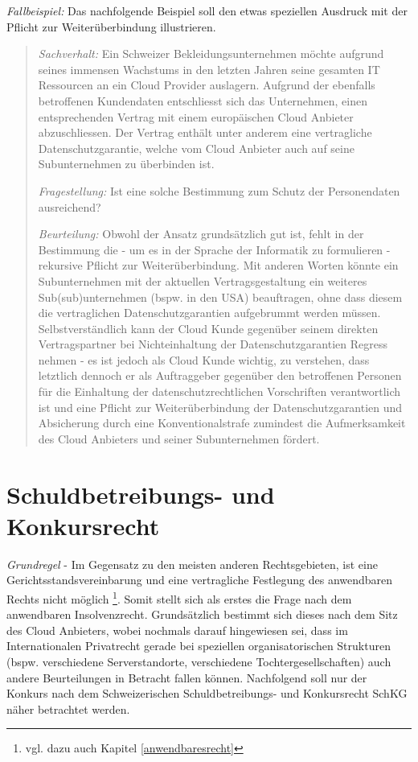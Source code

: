 \documentclass[a4paper,pointlessnumbers]{scrreprt}
\begin{document}
\textit{Fallbeispiel:} Das nachfolgende Beispiel soll den etwas speziellen Ausdruck \glqq mit der Pflicht zur Weiterüberbindung\grqq{} illustrieren.

\begin{quote}
\textit{Sachverhalt:} Ein Schweizer Bekleidungsunternehmen möchte aufgrund seines immensen Wachstums in den letzten Jahren seine gesamten IT Ressourcen an ein Cloud Provider auslagern. Aufgrund der ebenfalls betroffenen Kundendaten entschliesst sich das Unternehmen, einen entsprechenden Vertrag mit einem europäischen Cloud Anbieter abzuschliessen. Der Vertrag enthält unter anderem eine vertragliche Datenschutzgarantie, welche vom Cloud Anbieter auch auf seine Subunternehmen zu überbinden ist.

\textit{Fragestellung:} Ist eine solche Bestimmung zum Schutz der Personendaten ausreichend?

\textit{Beurteilung:} Obwohl der Ansatz grundsätzlich gut ist, fehlt in der Bestimmung die - um es in der Sprache der Informatik zu formulieren - rekursive Pflicht zur Weiterüberbindung. Mit anderen Worten könnte ein Subunternehmen mit der aktuellen Vertragsgestaltung ein weiteres Sub(sub)unternehmen (bspw. in den USA) beauftragen, ohne dass diesem die vertraglichen Datenschutzgarantien aufgebrummt werden müssen. Selbstverständlich kann der Cloud Kunde gegenüber seinem direkten Vertragspartner bei Nichteinhaltung der Datenschutzgarantien Regress nehmen -  es ist jedoch als Cloud Kunde wichtig, zu verstehen, dass letztlich dennoch er als Auftraggeber gegenüber den betroffenen Personen für die Einhaltung der datenschutzrechtlichen Vorschriften verantwortlich ist und eine Pflicht zur Weiterüberbindung der Datenschutzgarantien und Absicherung durch eine Konventionalstrafe zumindest die Aufmerksamkeit des Cloud Anbieters und seiner Subunternehmen fördert.
\end{quote}

\pagebreak

\section{Schuldbetreibungs- und Konkursrecht}\label{konkurs}
\textit{Grundregel} - Im Gegensatz zu den meisten anderen Rechtsgebieten, ist eine Gerichtsstandsvereinbarung und eine vertragliche Festlegung des anwendbaren Rechts nicht möglich \footnote{vgl. dazu auch Kapitel \ref{anwendbaresrecht}}. Somit stellt sich als erstes die Frage nach dem anwendbaren Insolvenzrecht. Grundsätzlich bestimmt sich dieses nach dem Sitz des Cloud Anbieters, wobei nochmals darauf hingewiesen sei, dass im Internationalen Privatrecht gerade bei speziellen organisatorischen Strukturen (bspw. verschiedene Serverstandorte, verschiedene Tochtergesellschaften) auch andere Beurteilungen in Betracht fallen können. Nachfolgend soll nur der Konkurs nach dem Schweizerischen Schuldbetreibungs- und Konkursrecht SchKG näher betrachtet werden.
\end{document}
